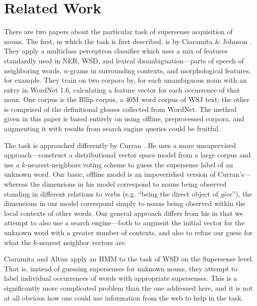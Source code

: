 \documentclass{article}
\begin{document}
\section{Related Work}


There are two papers about the particular task of supersense acquisition of nouns.
The first, in which the task is first described, is by Ciaramita \& Johnson \cite{cj}.
They apply a multiclass perceptron classifier which uses a mix of features standardly used in NER, WSD, and lexical disambiguation---parts of speech of neighboring words, $n$-grams in surrounding contexts, and morphological features, for example.
They train on two corpora by, for each unambiguous noun with an entry in WordNet 1.6, calculating a feature vector for each occurrence of that noun.
One corpus is the Bllip corpus, a 40M word corpus of WSJ text; the other is comprised of the definitional glosses collected from WordNet.
The method given in this paper is based entirely on using offline, preprocessed corpora, and augmenting it with results from search engine queries could be fruitful.

The task is approached differently by Curran \cite{curran}.
He uses a more unsupervised approach---construct a distributional vector space model from a large corpus and use a $k$-nearest-neighbors voting scheme to guess the supersense label of an unknown word.
Our basic, offline model is an impoverished version of Curran's---whereas the dimensions in his model correspond to nouns being observed standing in different relations to verbs (e.g. ``being the direct object of {\it give}''), the dimensions in our model correspond simply to nouns being observed within the local contexts of other words.
Our general approach differs from his in that we attempt to also use a search engine---both to augment the initial vector for the unknown word with a greater number of contexts, and also to refine our guess for what the $k$-nearest neighbor vectors are.

Ciaramita and Altun \cite{ciaramita-altun} apply an HMM to the task of WSD on the Supersense level.
That is, instead of guessing supersenses for unknown nouns, they attempt to label individual occurrences of words with appropriate supersenses.
This is a significantly more complicated problem than the one addressed here, and it is not at all obvious how one could use information from the web to help in the task.
\end{document}
